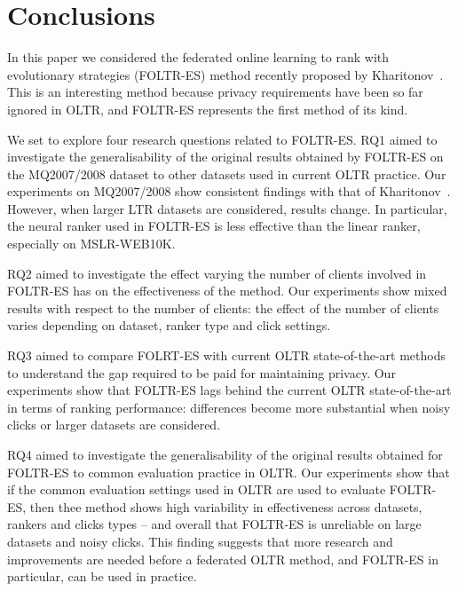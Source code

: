 \section{Conclusions}

In this paper we considered the federated online learning to rank with evolutionary strategies (FOLTR-ES) method recently proposed by Kharitonov~\cite{kharitonov2019federated}. This is an interesting method because privacy requirements have been so far ignored in OLTR, and FOLTR-ES represents the first method of its kind. 

We set to explore four research questions related to FOLTR-ES. RQ1 aimed to investigate the generalisability of the original results obtained by FOLTR-ES on the MQ2007/2008 dataset to other datasets used in current OLTR practice. Our  experiments on MQ2007/2008 show consistent findings with that of Kharitonov~\cite{kharitonov2019federated}. However, when larger LTR datasets are considered, results change. In particular, the neural ranker used in FOLTR-ES is less effective than the linear ranker, especially on MSLR-WEB10K. %

RQ2 aimed to investigate the effect varying the number of clients involved in FOLTR-ES has on the effectiveness of the method. %
Our experiments show mixed results with respect to the number of clients: the effect of the number of clients varies depending on dataset, ranker type and click settings. 

RQ3 aimed to compare FOLRT-ES with current OLTR state-of-the-art methods to understand the gap required to be paid for maintaining privacy. Our experiments show that FOLTR-ES lags behind the current OLTR state-of-the-art in terms of ranking performance: differences become more substantial when noisy clicks or larger datasets are considered. 

RQ4 aimed to investigate the generalisability of the original results obtained for FOLTR-ES to common evaluation practice in OLTR. Our experiments show that if the common evaluation settings used in OLTR are used to evaluate FOLTR-ES, then thee method shows high variability in effectiveness across datasets, rankers and clicks types -- and overall that FOLTR-ES is unreliable on large datasets and noisy clicks. This finding suggests that more research and improvements are needed before a federated OLTR method, and FOLTR-ES in particular, can be used in practice. 

